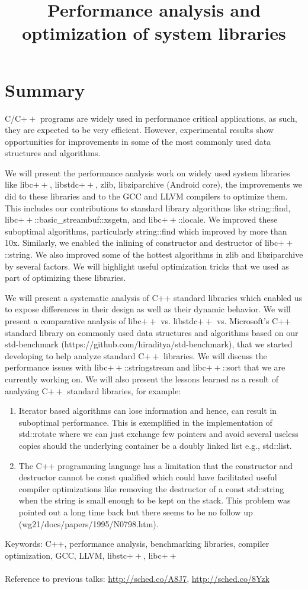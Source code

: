 \documentclass[10pt]{article}
\begin{document}
\title{Performance analysis and optimization of system libraries}

\date{}
\maketitle

\section*{Summary}
C/C$++$ programs are widely used in performance critical applications, as such,
they are expected to be very efficient. However, experimental results show
opportunities for improvements in some of the most commonly used data structures
and algorithms.

We will present the performance analysis work on widely used system libraries
like libc$++$, libstdc$++$, zlib, libziparchive (Android core), the improvements
we did to these libraries and to the GCC and LLVM compilers to optimize
them. This includes our contributions to standard library algorithms like
string::find, libc$++$::basic\_streambuf::xsgetn, and libc$++$::locale. We
improved these suboptimal algorithms, particularly string::find which improved
by more than 10x. Similarly, we enabled the inlining of constructor and
destructor of libc$++$::string. We also improved some of the hottest algorithms
in zlib and libziparchive by several factors. We will highlight useful
optimization tricks that we used as part of optimizing these libraries.

We will present a systematic analysis of C++ standard libraries which enabled us
to expose differences in their design as well as their dynamic behavior. We will
present a comparative analysis of libc$++$ vs. libstdc$++$ vs. Microsoft's C++
standard library on commonly used data structures and algorithms based on our
std-benchmark (https://github.com/hiraditya/std-benchmark), that we started
developing to help analyze standard C$++$ libraries. We will discuss the
performance issues with libc$++$::stringstream and libc$++$::sort that we are
currently working on. We will also present the lessons learned as a result of
analyzing C$++$ standard libraries, for example:
\begin{enumerate}
\item Iterator based algorithms can lose information and hence, can result in
  suboptimal performance.  This is exemplified in the implementation of
  std::rotate where we can just exchange few pointers and avoid several useless
  copies should the underlying container be a doubly linked list e.g.,
  std::list.
\item The C++ programming language has a limitation that the constructor and
  destructor cannot be const qualified which could have facilitated useful
  compiler optimizations like removing the destructor of a const std::string
  when the string is small enough to be kept on the stack. This problem was
  pointed out a long time back but there seems to be no follow up
  (wg21/docs/papers/1995/N0798.htm).
\end{enumerate}

Keywords: C++, performance analysis, benchmarking libraries, compiler
optimization, GCC, LLVM, libstc$++$, libc$++$
\\
\\
Reference to previous talks: \url{http://sched.co/A8J7}, \url{http://sched.co/8Yzk}
\end{document}
